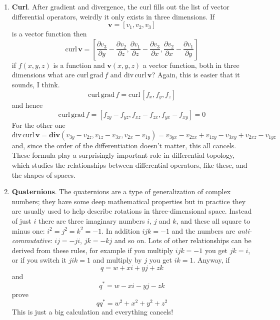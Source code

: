 \documentclass[11pt,a4paper]{scrartcl}
\begin{document}
\begin{enumerate}
 \item \textbf{Curl}. After gradient and divergence, the curl fills out the list of vector differential operators, weirdly it only exists in three dimensions. If 
\begin{equation}
    \mathbf{v}=[v_1,v_2,v_3]
  \end{equation}
is a vector function then
\begin{equation}
    \textrm{curl}\,\mathbf{v}=\left[\frac{\partial v_3}{\partial y}-\frac{\partial v_2}{\partial z},\frac{\partial v_1}{\partial z}-\frac{\partial v_3}{\partial x},\frac{\partial v_2}{\partial x}-\frac{\partial v_1}{\partial y}\right]
  \end{equation}
if $f(x,y,z)$ is a function and $\textbf{v}(x,y,z)$ a vector function, both in three dimensions what are $\textrm{curl}\,\textrm{grad}\,f$ and $\textrm{div}\,\textrm{curl}\,\textbf{v}$? Again, this is easier that it sounds, I think.
\begin{equation}
  \textrm{curl}\,\textrm{grad}\,f=\textrm{curl}\,[f_x,f_y,f_z]
\end{equation}
and hence
\begin{equation}
  \textrm{curl}\,\textrm{grad}\,f=[f_{zy}-f_{yz},f_{xz}-f_{zx},f_{yx}-f_{xy}]=\mathrm{0}
\end{equation}
For the other one
\begin{equation}
  \textrm{div}\,\textrm{curl}\,\textbf{v}=\textbf{div}(v_{3y}-v_{2z},v_{1z}-v_{3x},v_{2x}-v_{1y})=v_{3yx}-v_{2zx}+v_{1zy}-v_{3xy}+v_{2xz}-v_{1yz}
\end{equation}
and, since the order of the differentiation doesn't matter, this all cancels. These formula play a surprisingly important role in differential topology, which studies the relationships between differential operators, like these, and the shapes of spaces.

\item \textbf{Quaternions}. The quaternions are a type of generalization of complex numbers; they have some deep mathematical properties but in practice they are usually used to help describe rotations in three-dimensional space. Instead of just $i$ there are three imaginary numbers $i$, $j$ and $k$, and these all square to minus one: $i^2=j^2=k^2=-1$. In addition $ijk=-1$ and the numbers are \textsl{anti-commutative}: $ij=-ji$, $jk=-kj$ and so on. Lots of other relationships can be derived from these rules, for example if you multiply $ijk=-1$ you get $jk=i$, or if you switch it $jik=1$ and multiply by $j$ you get $ik=1$. Anyway, if
  \begin{equation}
    q=w+xi+yj+zk
  \end{equation}
  and
  \begin{equation}
    q^*=w-xi-yj-zk
  \end{equation}
  prove
  \begin{equation}
    qq^*=w^2+x^2+y^2+z^2
  \end{equation}
 This is just a big calculation and everything cancels! 
        
\end{enumerate}
\end{document}
